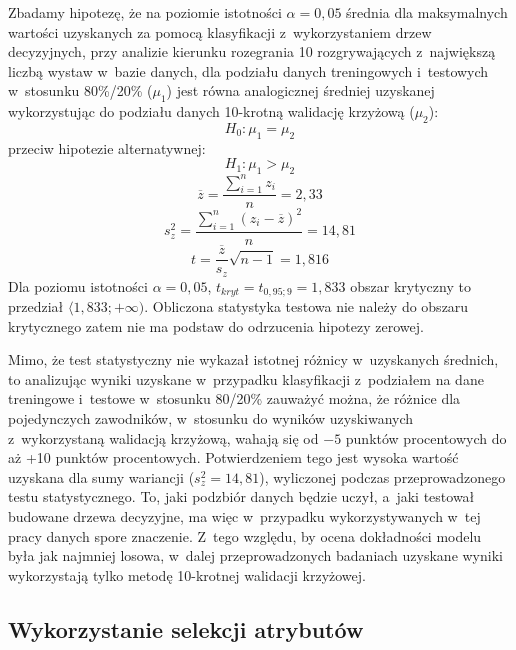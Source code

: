\documentclass[a4paper,twoside,12pt]{book}
\begin{document}
Zbadamy hipotezę, że na poziomie istotności $\alpha=0{,}05$ średnia dla maksymalnych wartości uzyskanych za pomocą klasyfikacji z~wykorzystaniem drzew decyzyjnych, przy analizie kierunku rozegrania 10 rozgrywających z~największą liczbą wystaw w~bazie danych, dla podziału danych treningowych i~testowych w~stosunku 80\%/20\% ($\mu_1$) jest równa analogicznej średniej uzyskanej wykorzystując do podziału danych 10-krotną walidację krzyżową ($\mu_2$):
\begin{equation}
H_{0}:\mu_1=\mu_2
\end{equation}
przeciw hipotezie alternatywnej:
\begin{equation}
H_{1}:\mu_1>\mu_2
\end{equation}
\begin{equation}
\overline{z} = \frac{\sum_{i=1}^{n}z_{i}}{n}=2{,}33
\end{equation}
\begin{equation}
s_{z}^{2}=\frac{\sum_{i=1}^{n}(z_{i}-\overline{z})^{2}}{n}=14{,}81
\end{equation}
\begin{equation}
t=\frac{\overline{z}}{s_z}\sqrt{n-1}=1{,}816
\end{equation}
Dla poziomu istotności $\alpha=0{,}05$, $t_{kryt}=t_{0{,}95;9}=1{,}833$ obszar krytyczny to przedział $\langle 1{,}833;+\infty)$. Obliczona statystyka testowa nie należy do obszaru krytycznego zatem nie ma podstaw do odrzucenia hipotezy zerowej. 

Mimo, że test statystyczny nie wykazał istotnej różnicy w~uzyskanych średnich, to analizując wyniki uzyskane w~przypadku klasyfikacji z~podziałem na dane treningowe i~testowe w~stosunku 80/20\% zauważyć można, że różnice dla pojedynczych zawodników, w~stosunku do wyników uzyskiwanych z~wykorzystaną walidacją krzyżową, wahają się od $-5$ punktów procentowych do aż +10 punktów procentowych. Potwierdzeniem tego jest wysoka wartość uzyskana dla sumy wariancji ($s_{z}^{2}=14{,}81$), wyliczonej podczas przeprowadzonego testu statystycznego. To, jaki podzbiór danych będzie uczył, a~jaki testował budowane drzewa decyzyjne, ma więc w~przypadku wykorzystywanych w~tej pracy danych spore znaczenie. Z~tego względu, by ocena dokładności modelu była jak najmniej losowa, w~dalej przeprowadzonych badaniach uzyskane wyniki wykorzystają tylko metodę 10-krotnej walidacji krzyżowej.

\subsection{Wykorzystanie selekcji atrybutów}
\end{document}
